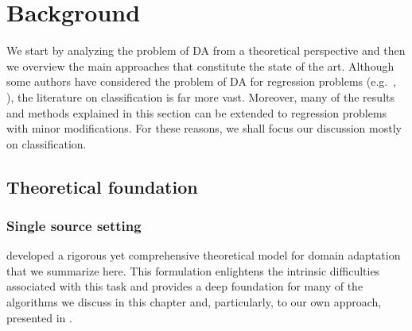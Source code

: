 \section{Background}
\label{sec:chp3_background}
We start by analyzing the problem of DA from a theoretical perspective and then we overview the main approaches that constitute the state of the art. Although some authors have considered the problem of DA for regression problems (e.g.\ \cite{Cortes2011}, \cite{Zhao2018}), the literature on classification is far more vast. Moreover, many of the results and methods explained in this section can be extended to regression problems with minor modifications. For these reasons, we shall focus our discussion mostly on classification.

\subsection{Theoretical foundation}
\label{sec:da_theory}

\subsubsection{Single source setting}
\label{sec:da_theory_ss}
\citet{BenDavid2010} developed a rigorous yet comprehensive theoretical model for domain adaptation that we summarize here. This formulation enlightens the intrinsic difficulties associated with this task and provides a deep foundation for many of the algorithms we discuss in this chapter and, particularly, to our own approach, presented in .

